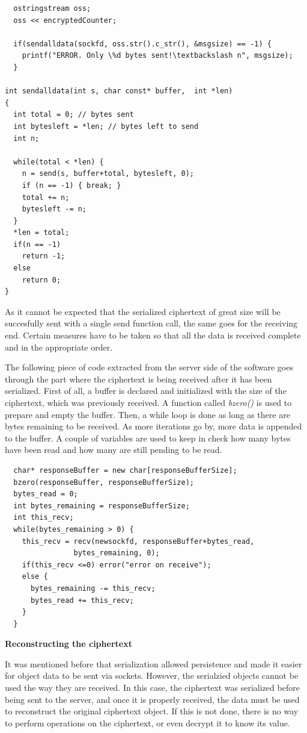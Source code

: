 \begin{lstlisting}
  ostringstream oss;
  oss << encryptedCounter;

  if(sendalldata(sockfd, oss.str().c_str(), &msgsize) == -1) {
    printf("ERROR. Only \%d bytes sent!\textbackslash n", msgsize);
  }

int sendalldata(int s, char const* buffer,  int *len)
{
  int total = 0; // bytes sent
  int bytesleft = *len; // bytes left to send
  int n;
  
  while(total < *len) {
    n = send(s, buffer+total, bytesleft, 0);
    if (n == -1) { break; }
    total += n;
    bytesleft -= n;
  }
  *len = total; 
  if(n == -1) 
    return -1;
  else 
    return 0;
}
\end{lstlisting}

As it cannot be expected that the serialized ciphertext of great size will be succesfully sent with a single send function call, the same goes for the receiving end. Certain measures have to be taken so that all the data is received complete and in the appropriate order.

The following piece of code extracted from the server side of the software goes through the part where the ciphertext is being received after it has been serialized. First of all, a buffer is declared and initialized with the size of the ciphertext, which was previously received. A function called \textit{bzero()} is used to prepare and empty the buffer.  Then, a while loop is done as long as there are bytes remaining to be received. As more iterations go by, more data is appended to the buffer. A couple of variables are used to keep in check how many bytes have been read and how many are still pending to be read.

\begin{lstlisting}
  char* responseBuffer = new char[responseBufferSize];
  bzero(responseBuffer, responseBufferSize);
  bytes_read = 0;
  int bytes_remaining = responseBufferSize;
  int this_recv;
  while(bytes_remaining > 0) {    
    this_recv = recv(newsockfd, responseBuffer+bytes_read,
                bytes_remaining, 0); 
    if(this_recv <=0) error("error on receive");
    else {
      bytes_remaining -= this_recv;
      bytes_read += this_recv;
    }
  }
\end{lstlisting}

\textbf{Reconstructing the ciphertext}

It was mentioned before that serialization allowed persistence and made it easier for object data to be sent via sockets. However, the serialzied objects cannot be used the way they are received. In this case, the ciphertext was serialized before being sent to the server, and once it is properly received, the data must be used to reconstruct the original ciphertext object.
If this is not done, there is no way to perform operations on the ciphertext, or even decrypt it to know its value.

